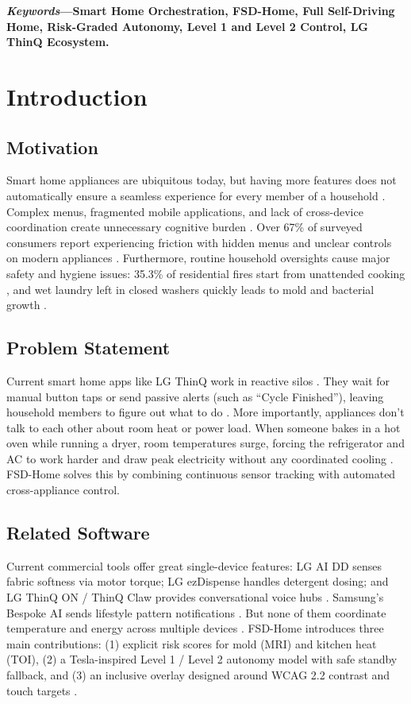 \documentclass[conference]{IEEEtran}
\begin{document}
\begin{IEEEkeywords}
\textbf{\emph{Keywords}---Smart Home Orchestration, FSD-Home, Full Self-Driving Home, Risk-Graded Autonomy, Level 1 and Level 2 Control, LG ThinQ Ecosystem.}
\end{IEEEkeywords}

\section{Introduction}

\subsection{Motivation}
Smart home appliances are ubiquitous today, but having more features does not automatically ensure a seamless experience for every member of a household \cite{b9}. Complex menus, fragmented mobile applications, and lack of cross-device coordination create unnecessary cognitive burden \cite{b10}. Over 67\% of surveyed consumers report experiencing friction with hidden menus and unclear controls on modern appliances \cite{b11}. Furthermore, routine household oversights cause major safety and hygiene issues: 35.3\% of residential fires start from unattended cooking \cite{b12, b13}, and wet laundry left in closed washers quickly leads to mold and bacterial growth \cite{b3, b14}.

\subsection{Problem Statement}
Current smart home apps like LG ThinQ work in reactive silos \cite{b15}. They wait for manual button taps or send passive alerts (such as ``Cycle Finished''), leaving household members to figure out what to do \cite{b6}. More importantly, appliances don't talk to each other about room heat or power load. When someone bakes in a hot oven while running a dryer, room temperatures surge, forcing the refrigerator and AC to work harder and draw peak electricity without any coordinated cooling \cite{b4}. FSD-Home solves this by combining continuous sensor tracking with automated cross-appliance control.

\subsection{Related Software}
Current commercial tools offer great single-device features: LG AI DD\texttrademark{} senses fabric softness via motor torque; LG ezDispense\texttrademark{} handles detergent dosing; and LG ThinQ ON / ThinQ Claw provides conversational voice hubs \cite{b1, b15}. Samsung's Bespoke AI sends lifestyle pattern notifications \cite{b2, b16}. But none of them coordinate temperature and energy across multiple devices \cite{b5}. FSD-Home introduces three main contributions: (1) explicit risk scores for mold (MRI) and kitchen heat (TOI), (2) a Tesla-inspired Level 1 / Level 2 autonomy model with safe standby fallback, and (3) an inclusive overlay designed around WCAG 2.2 contrast and touch targets \cite{b17}.
\end{document}
